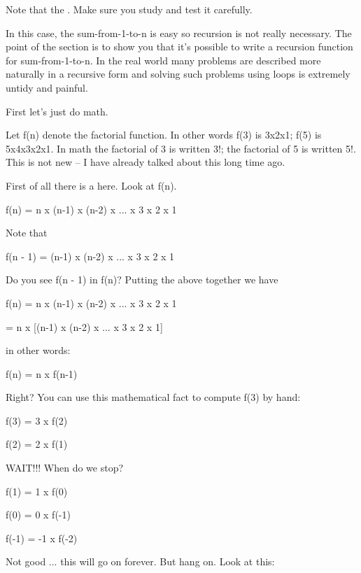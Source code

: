 Note that the . Make sure
you study and test it carefully.


In this case, the sum-from-1-to-n is easy so recursion is not really
necessary. The point of the section is to show you that
it's possible to write a recursion function for
sum-from-1-to-n. In the real world many problems are described more
naturally in a recursive form and solving such problems using loops is
extremely untidy and painful.








\newpage{}

First let's just do math.

Let f(n) denote the factorial function. In other words f(3) is 3x2x1;
f(5) is 5x4x3x2x1. In math the factorial of 3 is written 3!; the
factorial of 5 is written 5!. This is not new -- I have already talked
about this long time ago.

First of all there is a  here. Look at f(n).

f(n) = n x (n-1) x (n-2) x ... x 3 x 2 x 1

Note that

f(n - 1) = (n-1) x (n-2) x ... x 3 x 2 x 1

Do you see f(n - 1) in f(n)? Putting the above together we have

f(n) = n x (n-1) x (n-2) x ... x 3 x 2 x 1

= n x [(n-1) x (n-2) x ... x 3 x 2 x 1]

in other words:

f(n) = n x f(n-1)

Right? You can use this mathematical fact to compute f(3) by hand:

f(3) = 3 x f(2)

f(2) = 2 x f(1)

WAIT!!! When do we stop?

f(1) = 1 x f(0)

f(0) = 0 x f(-1)

f(-1) = -1 x f(-2)

Not good ... this will go on forever. But hang on. Look at this:

